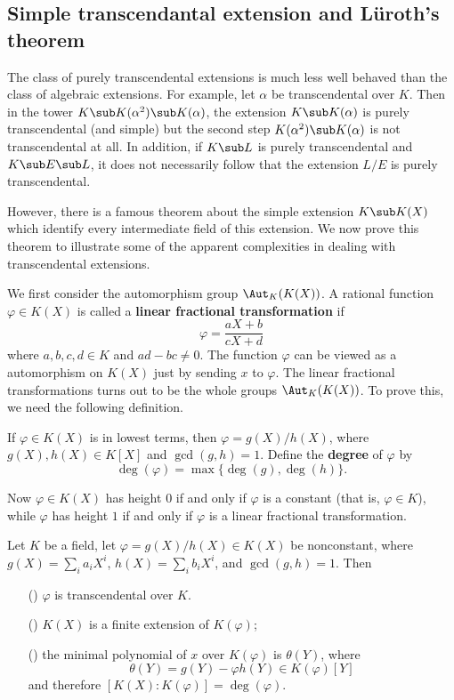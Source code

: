 \subsection{Simple transcendantal extension and L\"uroth's theorem}
The class of purely transcendental extensions is much less well behaved than the class of algebraic extensions. For example, let $\alpha$ be transcendental over $K$. Then in the tower $K\sub K(\alpha^2)\sub K(\alpha)$, the extension $K\sub K(\alpha)$ is purely transcendental (and simple) but the second step $K(\alpha^2)\sub K(\alpha)$ is not transcendental at all. In addition, if $K\sub L$ is purely transcendental and $K\sub E\sub L$, it does not necessarily follow that the extension $L/E$ is purely transcendental.\par
However, there is a famous theorem about the simple extension $K\sub K(X)$ which identify every intermediate field of this extension. We now prove this theorem to illustrate some of the apparent complexities in dealing with transcendental extensions.\par
We first consider the automorphism group $\Aut_K(K(X))$. A rational function $\varphi\in K(X)$ is called a \textbf{linear fractional transformation} if
\[\varphi=\frac{aX+b}{cX+d}\]
where $a,b,c,d\in K$ and $ad-bc\neq 0$. The function $\varphi$ can be viewed as a automorphism on $K(X)$ just by sending $x$ to $\varphi$. The linear fractional transformations turns out to be the whole groups $\Aut_K(K(X))$. To prove this, we need the following definition.
\begin{definition}
If $\varphi\in K(X)$ is in lowest terms, then $\varphi=g(X)/h(X)$, where $g(X),h(X)\in K[X]$ and $\gcd(g,h)=1$. Define the \textbf{degree} of $\varphi$ by
\[\deg(\varphi)=\max\{\deg(g),\deg(h)\}.\]
\end{definition}
Now $\varphi\in K(X)$ has height $0$ if and only if $\varphi$ is a constant (that is, $\varphi\in K$), while $\varphi$ has height $1$ if and only if $\varphi$ is a linear fractional transformation.
\begin{proposition}\label{field simple transcendental ext minimal poly of elements}
Let $K$ be a field, let $\varphi=g(X)/h(X)\in K(X)$ be nonconstant, where $g(X)=\sum_ia_iX^i$, $h(X)=\sum_ib_iX^i$, and $\gcd(g,h)=1$. Then
\begin{itemize}
\item[(\rmnum{1})] $\varphi$ is transcendental over $K$.
\item[(\rmnum{2})] $K(X)$ is a finite extension of $K(\varphi)$;
\item[(\rmnum{3})] the minimal polynomial of $x$ over $K(\varphi)$ is $\theta(Y)$, where
\[\theta(Y)=g(Y)-\varphi h(Y)\in K(\varphi)[Y]\]
and therefore $[K(X):K(\varphi)]=\deg(\varphi)$.
\end{itemize}
\end{proposition}
